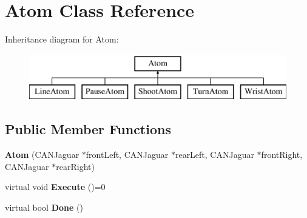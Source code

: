 \hypertarget{class_atom}{\section{Atom Class Reference}
\label{class_atom}
}
Inheritance diagram for Atom\-:\begin{figure}[H]
\begin{center}
\leavevmode
\includegraphics[height=2.000000cm]{class_atom}
\end{center}
\end{figure}
\subsection*{Public Member Functions}
\begin{DoxyCompactItemize}
\item 
\hypertarget{class_atom_af41beeaa245ff5f6e861ee4d76727984}{{\bfseries Atom} (C\-A\-N\-Jaguar $\ast$front\-Left, C\-A\-N\-Jaguar $\ast$rear\-Left, C\-A\-N\-Jaguar $\ast$front\-Right, C\-A\-N\-Jaguar $\ast$rear\-Right)}\label{class_atom_af41beeaa245ff5f6e861ee4d76727984}

\item 
\hypertarget{class_atom_a608318a9ac265ad2a30a62f501ff49d0}{virtual void {\bfseries Execute} ()=0}\label{class_atom_a608318a9ac265ad2a30a62f501ff49d0}

\item 
\hypertarget{class_atom_aad04a35d097df751c0e7196d29dc0d1d}{virtual bool {\bfseries Done} ()}\label{class_atom_aad04a35d097df751c0e7196d29dc0d1d}

\end{DoxyCompactItemize}
